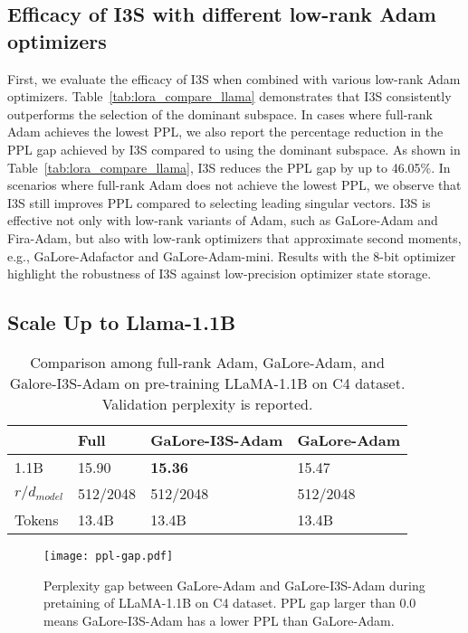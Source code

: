 \subsection{Efficacy of I3S with different low-rank Adam optimizers}
First, we evaluate the efficacy of I3S when combined with various low-rank Adam optimizers. Table~\ref{tab:lora_compare_llama} demonstrates that I3S consistently outperforms the selection of the dominant subspace. In cases where full-rank Adam achieves the lowest PPL, we also report the percentage reduction in the PPL gap achieved by I3S compared to using the dominant subspace. As shown in Table~\ref{tab:lora_compare_llama}, I3S reduces the PPL gap by up to 46.05\%. In scenarios where full-rank Adam does not achieve the lowest PPL, we observe that I3S still improves PPL compared to selecting leading singular vectors. I3S is effective not only with low-rank variants of Adam, such as GaLore-Adam and Fira-Adam, but also with low-rank optimizers that approximate second moments, e.g., GaLore-Adafactor and GaLore-Adam-mini. Results with the 8-bit optimizer highlight the robustness of I3S against low-precision optimizer state storage.



\subsection{Scale Up to Llama-1.1B}
\begin{table}[!ht]
    \centering
    \caption{Comparison among full-rank Adam, GaLore-Adam, and Galore-I3S-Adam on pre-training LLaMA-1.1B on C4 dataset. Validation perplexity is reported.}
    \label{tab:1.1b-llama}

    \begin{tabular}{p{1cm}p{1cm}p{3cm}p{1.6cm}}
    \toprule
               &  Full &  GaLore-I3S-Adam & GaLore-Adam \tabularnewline
    \midrule
    1.1B & 15.90 & \textbf{15.36} & 15.47 \\
    $r / d_{model}$ & 512/2048 & 512/2048 & 512/2048 \\
    Tokens & 13.4B & 13.4B & 13.4B \\ %
    \bottomrule
    \end{tabular}
\end{table}



\begin{figure}[!ht]
    \centering
    \texttt{[image: ppl-gap.pdf]}
    \caption{Perplexity gap between GaLore-Adam and GaLore-I3S-Adam during pretaining of LLaMA-1.1B on C4 dataset. PPL gap larger than 0.0 means GaLore-I3S-Adam has a lower PPL than GaLore-Adam.}
    \label{fig:ppl-gap}
\end{figure} 

